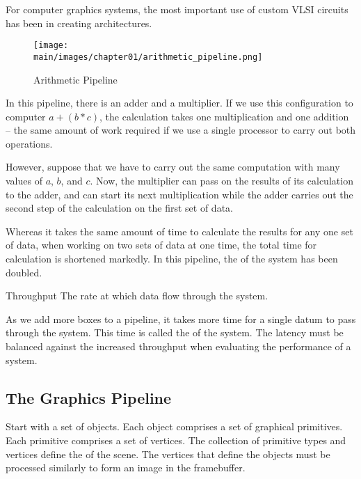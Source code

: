 \documentclass[\main/notes.tex]{subfiles}
\begin{document}
				For computer graphics systems,
				the most important use of custom VLSI circuits has been in creating
				 architectures.

				\begin{example}
					\begin{wrapfigure}{r}{0.5\textwidth}
						\begin{center}
							\texttt{[image: \\main/images/chapter01/arithmetic\_pipeline.png]}
						\end{center}
						\caption{Arithmetic Pipeline}
					\end{wrapfigure}
					In this pipeline, there is an adder and a multiplier.
					If we use this configuration to computer $a + (b * c)$,
					the calculation takes one multiplication and one addition
					-- the same amount of work required if we use a single processor
					to carry out both operations.

					However, suppose that we have to carry out the same computation
					with many values of $a$, $b$, and $c$.
					Now, the multiplier can pass on the results of its calculation
					to the adder,
					and can start its next multiplication
					while the adder carries out the second step of the calculation
					on the first set of data.

					Whereas it takes the same amount of time to calculate the results
					for any one set of data,
					when working on two sets of data at one time,
					the total time for calculation is shortened markedly.
					In this pipeline, the  of the system
					has been doubled.
				\end{example}

				\begin{definition}{Throughput}
					The rate at which data flow through the system.
				\end{definition}

				As we add more boxes to a pipeline,
				it takes more time for a single datum to pass through the system.
				This time is called the  of the system.
				The latency must be balanced against the increased throughput
				when evaluating the performance of a system.

			\subsection{The Graphics Pipeline}
				Start with a set of objects.
				Each object comprises a set of graphical primitives.
				Each primitive comprises a set of vertices.
				The collection of primitive types and vertices define
				the  of the scene.
				The vertices that define the objects
				must be processed similarly to form an image in the framebuffer.
\end{document}

